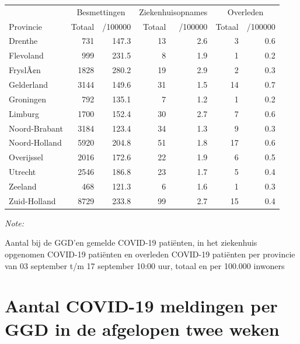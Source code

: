 \documentclass[
  english,
  man,floatsintext]{apa6}
\begin{document}
\begin{table}
\centering
\begin{threeparttable}
\begin{tabular}{lrrrrrr}
\toprule
\multicolumn{1}{c}{ } & \multicolumn{2}{c}{Besmettingen} & \multicolumn{2}{c}{Ziekenhuisopnames} & \multicolumn{2}{c}{Overleden} \\
\cmidrule(l{3pt}r{3pt}){2-3} \cmidrule(l{3pt}r{3pt}){4-5} \cmidrule(l{3pt}r{3pt}){6-7}
Provincie & Totaal & /100000 & Totaal & /100000 & Totaal & /100000\\
\midrule
Drenthe & 731 & 147.3 & 13 & 2.6 & 3 & 0.6\\
Flevoland & 999 & 231.5 & 8 & 1.9 & 1 & 0.2\\
FryslÃ¢n & 1828 & 280.2 & 19 & 2.9 & 2 & 0.3\\
Gelderland & 3144 & 149.6 & 31 & 1.5 & 14 & 0.7\\
Groningen & 792 & 135.1 & 7 & 1.2 & 1 & 0.2\\
Limburg & 1700 & 152.4 & 30 & 2.7 & 7 & 0.6\\
Noord-Brabant & 3184 & 123.4 & 34 & 1.3 & 9 & 0.3\\
Noord-Holland & 5920 & 204.8 & 51 & 1.8 & 17 & 0.6\\
Overijssel & 2016 & 172.6 & 22 & 1.9 & 6 & 0.5\\
Utrecht & 2546 & 186.8 & 23 & 1.7 & 5 & 0.4\\
Zeeland & 468 & 121.3 & 6 & 1.6 & 1 & 0.3\\
Zuid-Holland & 8729 & 233.8 & 99 & 2.7 & 15 & 0.4\\
\bottomrule
\end{tabular}
\begin{tablenotes}
\item \textit{Note: } 
\item Aantal bij de GGD’en gemelde COVID-19 patiënten, in het ziekenhuis opgenomen COVID-19 patiënten en overleden COVID-19 patiënten per provincie van 03 september t/m 17 september 10:00 uur, totaal en per 100.000 inwoners
\end{tablenotes}
\end{threeparttable}
\end{table}

\newpage

\hypertarget{aantal-covid-19-meldingen-per-ggd-in-de-afgelopen-twee-weken}{%
\section{Aantal COVID-19 meldingen per GGD in de afgelopen twee weken}\label{aantal-covid-19-meldingen-per-ggd-in-de-afgelopen-twee-weken}}
\end{document}
